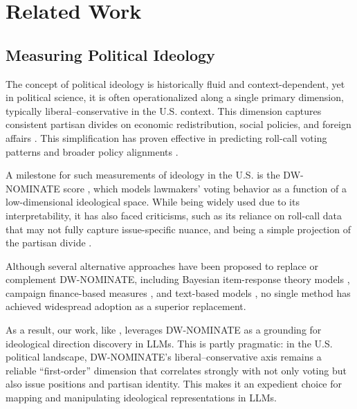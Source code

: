 \documentclass[11pt]{article}
\begin{document}
\section{Related Work}

\subsection{Measuring Political Ideology}

The concept of political ideology is historically fluid and context-dependent, yet in political science, it is often operationalized along a single primary dimension, typically liberal--conservative in the U.S. context. This dimension captures consistent partisan divides on economic redistribution, social policies, and foreign affairs \citep{pooleSpatialModelsParliamentary2005, mccartyDefenseDWNOMINATE2016}. This simplification has proven effective in predicting roll-call voting patterns and broader policy alignments \citep{carrollMeasuringBiasUncertainty2009}.

A milestone for such measurements of ideology in the U.S. is the DW-NOMINATE score \citep{pooleSpatialModelsParliamentary2005,carrollMeasuringBiasUncertainty2009}, which models lawmakers' voting behavior as a function of a low-dimensional ideological space. While being widely used due to its interpretability, it has also faced criticisms, such as its reliance on roll-call data that may not fully capture issue-specific nuance, and being a simple projection of the partisan divide \citep{mccartyDefenseDWNOMINATE2016}.

Although several alternative approaches have been proposed to replace or complement DW-NOMINATE, including Bayesian item-response theory models \citep{caugheyDynamicEstimationLatent2015}, campaign finance-based measures \citep{bonicaMappingIdeologicalMarketplace2014}, and text-based models \citep{vafaTextBasedIdealPoints2020}, no single method has achieved widespread adoption as a superior replacement.

As a result, our work, like \citet{kimLinearRepresentationsPolitical2025}, leverages DW-NOMINATE as a grounding for ideological direction discovery in LLMs. This is partly pragmatic: in the U.S. political landscape, DW-NOMINATE's liberal--conservative axis remains a reliable “first-order” dimension that correlates strongly with not only voting but also issue positions and partisan identity. This makes it an expedient choice for mapping and manipulating ideological representations in LLMs.
\end{document}
